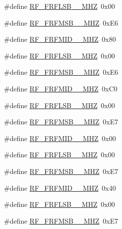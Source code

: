 \begin{DoxyCompactItemize}
\item 
\#define \mbox{\hyperlink{sx1276_regs-_fsk_8h_a1f2bb1e7bc8fbd6e621de9eba5c86f91}{R\+F\+\_\+\+F\+R\+F\+L\+S\+B\+\_\+\_\+\+M\+HZ}}~0x00
\item 
\#define \mbox{\hyperlink{sx1276_regs-_fsk_8h_a963d533d9223136c79c216730aa5652a}{R\+F\+\_\+\+F\+R\+F\+M\+S\+B\+\_\+\_\+\+M\+HZ}}~0x\+E6
\item 
\#define \mbox{\hyperlink{sx1276_regs-_fsk_8h_a8a4cffed719d7412c18649f04f7b5c5e}{R\+F\+\_\+\+F\+R\+F\+M\+I\+D\+\_\+\_\+\+M\+HZ}}~0x80
\item 
\#define \mbox{\hyperlink{sx1276_regs-_fsk_8h_ad25234b1263e37abda8f6cc585c939ca}{R\+F\+\_\+\+F\+R\+F\+L\+S\+B\+\_\+\_\+\+M\+HZ}}~0x00
\item 
\#define \mbox{\hyperlink{sx1276_regs-_fsk_8h_aa6e42390611123d77589fc770058555c}{R\+F\+\_\+\+F\+R\+F\+M\+S\+B\+\_\+\_\+\+M\+HZ}}~0x\+E6
\item 
\#define \mbox{\hyperlink{sx1276_regs-_fsk_8h_a90947d1a0f48c89486946fffe628ff78}{R\+F\+\_\+\+F\+R\+F\+M\+I\+D\+\_\+\_\+\+M\+HZ}}~0x\+C0
\item 
\#define \mbox{\hyperlink{sx1276_regs-_fsk_8h_a347e6771a94a6176cc90415848828eb1}{R\+F\+\_\+\+F\+R\+F\+L\+S\+B\+\_\+\_\+\+M\+HZ}}~0x00
\item 
\#define \mbox{\hyperlink{sx1276_regs-_fsk_8h_ad8aba952c014e2c08340d73f404f3072}{R\+F\+\_\+\+F\+R\+F\+M\+S\+B\+\_\+\_\+\+M\+HZ}}~0x\+E7
\item 
\#define \mbox{\hyperlink{sx1276_regs-_fsk_8h_ad9f0fa1a4f699e3fa4e6095c50423f20}{R\+F\+\_\+\+F\+R\+F\+M\+I\+D\+\_\+\_\+\+M\+HZ}}~0x00
\item 
\#define \mbox{\hyperlink{sx1276_regs-_fsk_8h_a0121ab508575ecf2f3af83b4affe913d}{R\+F\+\_\+\+F\+R\+F\+L\+S\+B\+\_\+\_\+\+M\+HZ}}~0x00
\item 
\#define \mbox{\hyperlink{sx1276_regs-_fsk_8h_a9317e75c46b2888c847f5d5560fc4295}{R\+F\+\_\+\+F\+R\+F\+M\+S\+B\+\_\+\_\+\+M\+HZ}}~0x\+E7
\item 
\#define \mbox{\hyperlink{sx1276_regs-_fsk_8h_ad764821102179c03fa856b0068bce2c1}{R\+F\+\_\+\+F\+R\+F\+M\+I\+D\+\_\+\_\+\+M\+HZ}}~0x40
\item 
\#define \mbox{\hyperlink{sx1276_regs-_fsk_8h_ac2d3a6fb3a8d88975487b7c811bbd99c}{R\+F\+\_\+\+F\+R\+F\+L\+S\+B\+\_\+\_\+\+M\+HZ}}~0x00
\item 
\#define \mbox{\hyperlink{sx1276_regs-_fsk_8h_a65a33036761574a1a055363a12432579}{R\+F\+\_\+\+F\+R\+F\+M\+S\+B\+\_\+\_\+\+M\+HZ}}~0x\+E7

\end{DoxyCompactItemize}
